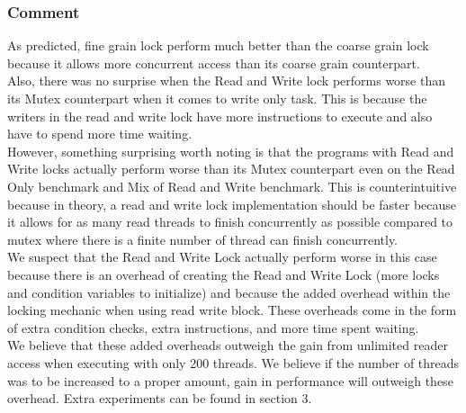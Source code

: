 \documentclass[11pt]{article}
\begin{document}
\subsubsection{Comment}
As predicted, fine grain lock perform much better than the coarse grain lock because it allows more concurrent access than its coarse grain counterpart.\\
Also, there was no surprise when the Read and Write lock performs worse than its Mutex counterpart when it comes to write only task. This is because the writers in the read and write lock have more instructions to execute and also have to spend more time waiting.\\
However, something surprising worth noting is that the programs with Read and Write locks actually perform worse than its Mutex counterpart even on the Read Only benchmark and Mix of Read and Write benchmark. This is counterintuitive because in theory, a read and write lock implementation should be faster because it allows for as many read threads to finish concurrently as possible compared to mutex where there is a finite number of thread can finish concurrently.\\
We suspect that the Read and Write Lock actually perform worse in this case because there is an overhead of creating the Read and Write Lock (more locks and condition variables to initialize) and because the added overhead within the locking mechanic when using read write block. These overheads come in the form of extra condition checks, extra instructions, and more time spent waiting.\\
We believe that these added overheads outweigh the gain from unlimited reader access when executing with only 200 threads. We believe if the number of threads was to be increased to a proper amount, gain in performance will outweigh these overhead. Extra experiments can be found in section 3.
\end{document}
